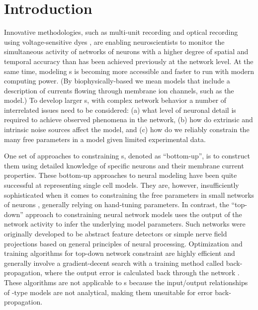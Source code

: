 


\section{Introduction}\label{sec:GA:intro}

Innovative methodologies, such as multi-unit recording
\citep{BrownKassEtAl:2004} and optical recording using
voltage-sensitive dyes
\citep{GrinvaldHildesheim:2004,YangDoiEtAl:2000}, are enabling
neuroscientists to monitor the simultaneous activity of networks of
neurons with a higher degree of spatial and temporal accuracy than has
been achieved previously at the network level. At the same time,
modeling {\BNN}s is becoming more
accessible and faster to run with modern computing power. (By
biophysically-based we mean models that include a description of
currents flowing through membrane ion channels, such as the
{\HH} model.)  To develop larger {\BNN}s, with complex network
behavior a number of interrelated issues need to be considered: (a)
what level of neuronal detail is required to achieve observed
phenomena in the network, (b) how do extrinsic and intrinsic noise
sources affect the model, and (c) how do we reliably constrain the
many free parameters in a model given limited experimental data.

\smallskip{} 

One set of approaches to constraining {\BNN}s, denoted as ``bottom-up'',
is to construct them using detailed knowledge of specific neurons and
their membrane current properties. These bottom-up approaches to
neural modeling have been quite successful at representing single cell
models. They are, however, insufficiently sophisticated when it comes
to constraining the free parameters in small networks of neurons
\citep{GrillnerMarkramEtAl:2005,KochSegev:1998}, generally relying on
hand-tuning parameters. In contrast, the ``top-down'' approach to
constraining neural network models uses the output of the network
activity to infer the underlying model parameters. Such networks were
originally developed to be abstract feature detectors
\citep{Malsberg:1973} or simple nerve field projections
\citep{Amari:1980} based on general principles of neural processing.
Optimization and training algorithms for top-down network constraint
are highly efficient and generally involve a gradient-decent search
with a training method called back-propagation, where the output error
is calculated back through the network
\citep{RumelhartHintonEtAl:1986a}. These algorithms are not applicable
to {\BNN}s because the input/output relationships of {\HH}-type
models are not analytical, making them unsuitable for error
back-propagation.

